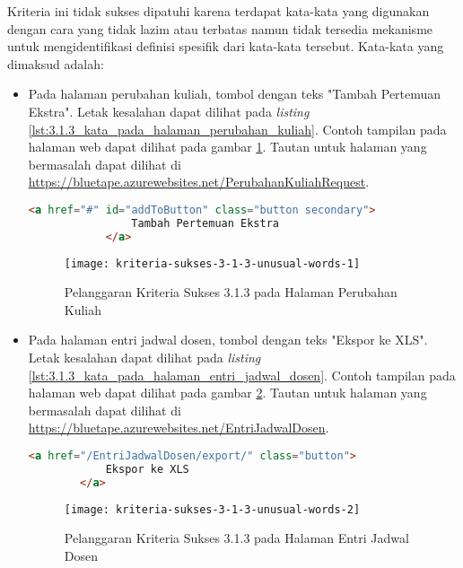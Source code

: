 Kriteria ini tidak sukses dipatuhi karena terdapat kata-kata yang digunakan dengan cara yang tidak lazim atau terbatas namun tidak tersedia mekanisme untuk mengidentifikasi definisi spesifik dari kata-kata tersebut. Kata-kata yang dimaksud adalah:

\begin{itemize}
    \item Pada halaman perubahan kuliah, tombol dengan teks "Tambah Pertemuan Ekstra". Letak kesalahan dapat dilihat pada \textit{listing} \ref{lst:3.1.3_kata_pada_halaman_perubahan_kuliah}. Contoh tampilan pada halaman web dapat dilihat pada gambar \ref{fig:3.1.3_unusual_words_1}. Tautan untuk halaman yang bermasalah dapat dilihat di \url{https://bluetape.azurewebsites.net/PerubahanKuliahRequest}.
    \begin{lstlisting}[frame=single, label={lst:3.1.3_kata_pada_halaman_perubahan_kuliah}, language=HTML, caption=Pelanggaran Kriteria Sukses 3.1.3 pada Halaman Perubahan Kuliah]
            <a href="#" id="addToButton" class="button secondary">
                Tambah Pertemuan Ekstra
            </a>
    \end{lstlisting}
    
    \begin{figure}[H]
        \centering  
        \texttt{[image: kriteria-sukses-3-1-3-unusual-words-1]}  
        \caption[Pelanggaran Kriteria Sukses 3.1.3 pada Halaman Perubahan Kuliah]{Pelanggaran Kriteria Sukses 3.1.3 pada Halaman Perubahan Kuliah}
        \label{fig:3.1.3_unusual_words_1}  
    \end{figure}
    
    \item Pada halaman entri jadwal dosen, tombol dengan teks "Ekspor ke XLS". Letak kesalahan dapat dilihat pada \textit{listing} \ref{lst:3.1.3_kata_pada_halaman_entri_jadwal_dosen}. Contoh tampilan pada halaman web dapat dilihat pada gambar \ref{fig:3.1.3_unusual_words_2}. Tautan untuk halaman yang bermasalah dapat dilihat di \url{https://bluetape.azurewebsites.net/EntriJadwalDosen}.
    \begin{lstlisting}[frame=single, label={lst:3.1.3_kata_pada_halaman_entri_jadwal_dosen}, language=HTML, caption=Pelanggaran Kriteria Sukses 3.1.3 pada Halaman Entri Jadwal Dosen]
        <a href="/EntriJadwalDosen/export/" class="button">
            Ekspor ke XLS
        </a>
    \end{lstlisting}
    
    \begin{figure}[H]
        \centering  
        \texttt{[image: kriteria-sukses-3-1-3-unusual-words-2]}  
        \caption[Pelanggaran Kriteria Sukses 3.1.3 pada Halaman Entri Jadwal Dosen]{Pelanggaran Kriteria Sukses 3.1.3 pada Halaman Entri Jadwal Dosen}
        \label{fig:3.1.3_unusual_words_2}  
    \end{figure}


\end{itemize}
